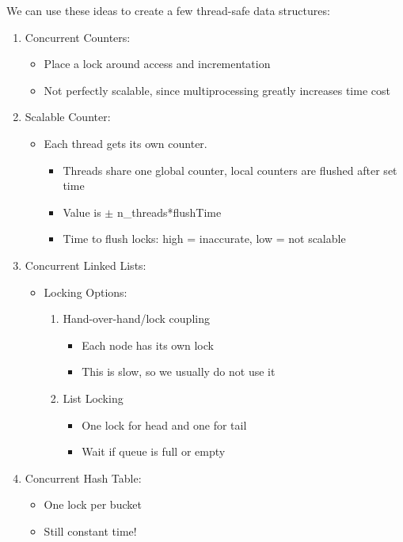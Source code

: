 \documentclass[../../lecture_notes.tex]{subfiles}
\begin{document}
We can use these ideas to create a few thread-safe data structures:
\begin{enumerate}[nosep]
\item Concurrent Counters:
	\begin{itemize}
		\item Place a lock around access and incrementation
		\item Not perfectly scalable, since multiprocessing greatly increases time cost
	\end{itemize}
\item Scalable Counter:
	\begin{itemize}
		\item Each thread gets its own counter.
		\begin{itemize}
			\item Threads share one global counter, local counters are flushed after set time
			\item Value is $\pm$ n\_threads*flushTime 
			\item Time to flush locks: high = inaccurate, low = not scalable
		\end{itemize}
	\end{itemize}
\item Concurrent Linked Lists: 
	\begin{itemize}
	\item Locking Options:
	\begin{enumerate}
		\item Hand-over-hand/lock coupling
			\begin{itemize}
				\item Each node has its own lock
				\item This is slow, so we usually do not use it
			\end{itemize}
		\item List Locking
			\begin{itemize}
				\item One lock for head and one for tail
				\item Wait if queue is full or empty
			\end{itemize}
	\end{enumerate}
	\end{itemize}
\item Concurrent Hash Table:
	\begin{itemize}
		\item One lock per bucket
		\item Still constant time!
	\end{itemize}
\end{enumerate}
\end{document}
